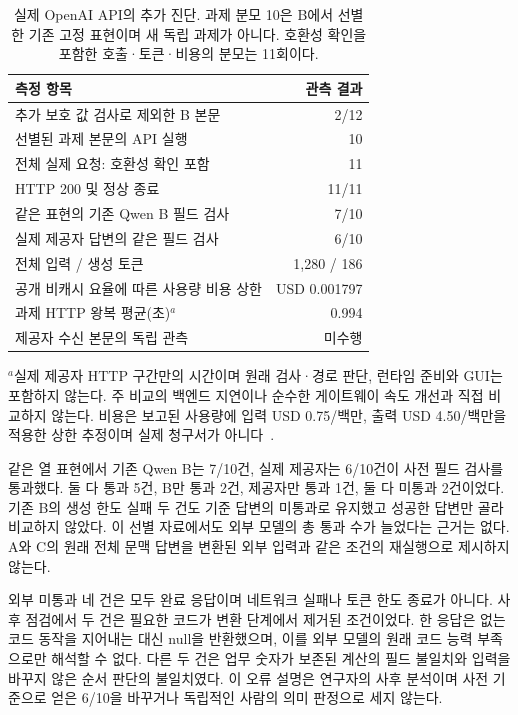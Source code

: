 \documentclass[10pt,letterpaper,twocolumn]{article}
\newcommand{\smalltable}{\small\setlength{\tabcolsep}{3pt}\renewcommand{\arraystretch}{1.13}}
\begin{document}
\begin{table}[tbp]
\centering
\caption{실제 OpenAI API의 추가 진단. 과제 분모 10은 B에서 선별한 기존 고정 표현이며 새 독립 과제가 아니다. 호환성 확인을 포함한 호출·토큰·비용의 분모는 11회이다.}
\label{tab:external-diagnostic}
\smalltable
\begin{tabular*}{\linewidth}{@{\extracolsep{\fill}}lr@{}}
\toprule
측정 항목 & 관측 결과 \\
\midrule
추가 보호 값 검사로 제외한 B 본문 & 2/12 \\
선별된 과제 본문의 API 실행 & 10 \\
전체 실제 요청: 호환성 확인 포함 & 11 \\
HTTP 200 및 정상 종료 & 11/11 \\
같은 표현의 기존 Qwen B 필드 검사 & 7/10 \\
실제 제공자 답변의 같은 필드 검사 & 6/10 \\
전체 입력 / 생성 토큰 & 1,280 / 186 \\
공개 비캐시 요율에 따른 사용량 비용 상한 & USD 0.001797 \\
과제 HTTP 왕복 평균(초)$^{a}$ & 0.994 \\
제공자 수신 본문의 독립 관측 & 미수행 \\
\bottomrule
\end{tabular*}
\par\smallskip
\parbox{\linewidth}{\footnotesize $^{a}$실제 제공자 HTTP 구간만의 시간이며 원래 검사·경로 판단, 런타임 준비와 GUI는 포함하지 않는다. 주 비교의 백엔드 지연이나 순수한 게이트웨이 속도 개선과 직접 비교하지 않는다. 비용은 보고된 사용량에 입력 USD 0.75/백만, 출력 USD 4.50/백만을 적용한 상한 추정이며 실제 청구서가 아니다~\citep{openaimodel}.}
\end{table}

같은 열 표현에서 기존 Qwen B는 7/10건, 실제 제공자는 6/10건이 사전 필드 검사를 통과했다. 둘 다 통과 5건, B만 통과 2건, 제공자만 통과 1건, 둘 다 미통과 2건이었다. 기존 B의 생성 한도 실패 두 건도 기준 답변의 미통과로 유지했고 성공한 답변만 골라 비교하지 않았다. 이 선별 자료에서도 외부 모델의 총 통과 수가 늘었다는 근거는 없다. A와 C의 원래 전체 문맥 답변을 변환된 외부 입력과 같은 조건의 재실행으로 제시하지 않는다.

외부 미통과 네 건은 모두 완료 응답이며 네트워크 실패나 토큰 한도 종료가 아니다. 사후 점검에서 두 건은 필요한 코드가 변환 단계에서 제거된 조건이었다. 한 응답은 없는 코드 동작을 지어내는 대신 null을 반환했으며, 이를 외부 모델의 원래 코드 능력 부족으로만 해석할 수 없다. 다른 두 건은 업무 숫자가 보존된 계산의 필드 불일치와 입력을 바꾸지 않은 순서 판단의 불일치였다. 이 오류 설명은 연구자의 사후 분석이며 사전 기준으로 얻은 6/10을 바꾸거나 독립적인 사람의 의미 판정으로 세지 않는다.
\end{document}

